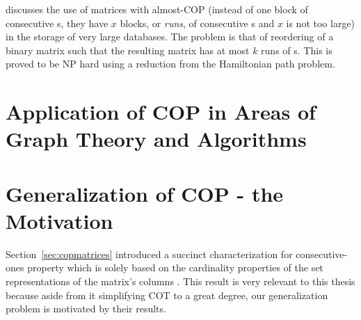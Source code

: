 \cite{jkckv04} discusses the use of matrices with almost-COP (instead
of one block of consecutive {\un}s, they have $x$ blocks, or {\em
  runs}, of consecutive {\un}s and $x$ is not too large) in the
storage of very large databases.  The problem is that of reordering of
a binary matrix such that the resulting matrix has at most $k$ runs of
{\un}s. This is proved to be NP hard using a reduction from the
Hamiltonian path problem.
  



\section{Application of COP in Areas of Graph Theory and
  Algorithms}
\label{sec:appcopGTA}


\label{sec:apprdbm}

\label{sec:appgraphiso}

\label{sec:appcertalgo}


\section{Generalization of COP - the Motivation}
\label{sec:motive}
Section~\ref{sec:copmatrices} introduced a succinct characterization
for consecutive-ones property which is solely based on the cardinality
properties of the set representations of the matrix's columns
\cite{nsnrs09}. This result is very relevant to this thesis because
aside from it simplifying COT to a great degree, our generalization
problem is motivated by their results.


